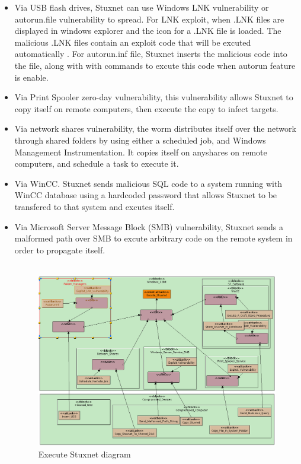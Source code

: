 \documentclass[a4paper,12pt,oneside]{report}
\begin{document}
	\begin{itemize}
	\item Via USB flash drives, Stuxnet can use Windows LNK vulnerability or autorun.file vulnerability to spread. For LNK exploit, when .LNK files are displayed in windows explorer and the icon for a .LNK file is loaded. The malicious .LNK files contain an exploit code that will be excuted automatically . For autorun.inf file,  Stuxnet inserts the malicious code into the file, along with with commands to excute this code when autorun feature is enable.
	\item Via Print Spooler zero-day vulnerability, this vulnerability allows Stuxnet to copy itself on remote computers, then execute the copy to infect targets. 
	\item Via network shares vulnerability, the worm distributes itself over the network through shared folders by using either a scheduled job, and Windows Management Instrumentation. It copies itself on anyshares on remote computers, and schedule a task to execute it.
	\item Via WinCC. Stuxnet sends malicious SQL code to a system running with WinCC database using a hardcoded password that allows Stuxnet to be transfered to that system and excutes itself.
	\item Via Microsoft Server Message Block (SMB) vulnerability, Stuxnet sends a malformed path over SMB to excute arbitrary code on the remote system in order to propagate itself.\\\\
	\begin{figure}[hb]
	 \centering
	\includegraphics[scale=0.40]{Execute_Stuxnet.png}				\caption{Execute Stuxnet diagram}

\end{figure}
\end{itemize}
\end{document}
